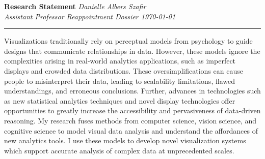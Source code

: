 \documentclass[11pt]{article}
\begin{document}
\setlength{\belowcaptionskip}{-10pt}

\thispagestyle{fancy}

\textbf{\Large Research Statement}
{\hspace{220pt}\emph{Danielle Albers Szafir\\Assistant Professor Reappointment Dossier \hspace{185pt}\today} \vspace{3pt}}
\hrule


Visualizations traditionally rely on perceptual models from psychology to guide designs that communicate relationships in data.  However, these models ignore the complexities arising in real-world analytics applications, such as imperfect displays and crowded data distributions. These oversimplifications can cause people to misinterpret their data, leading to scalability limitations, flawed understandings, and erroneous conclusions. Further, advances in technologies such as new statistical analytics techniques and novel display technologies offer opportunities 
to greatly increase the accessibility and pervasiveness of data-driven reasoning. My research fuses methods from computer science, vision science, and cognitive science to model visual data analysis and understand the affordances of new analytics tools. I use these models to develop novel visualization systems which support accurate analysis of complex data at unprecedented scales.
\end{document}
